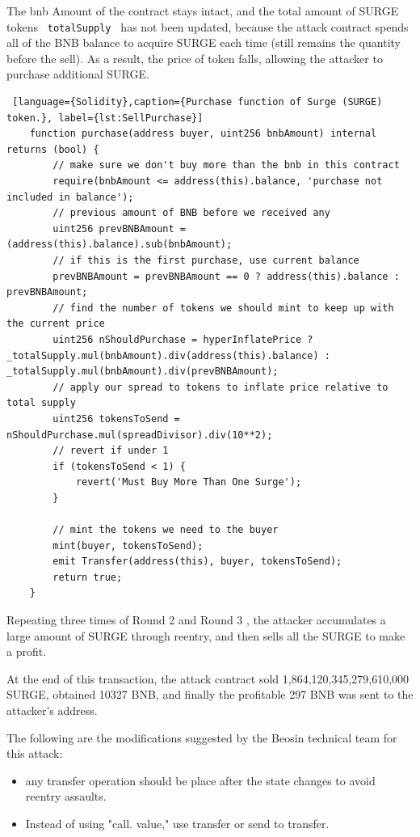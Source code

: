 The bnb Amount of the contract stays intact, and the total amount of SURGE tokens \texttt{ totalSupply }  
has not been updated, because the attack contract spends all of the BNB balance to acquire SURGE
 each time (still remains the quantity before the sell).
As a result, the price of token falls, allowing the attacker to purchase additional SURGE. 


\begin{lstlisting} [language={Solidity},caption={Purchase function of Surge (SURGE) token.}, label={lst:SellPurchase}]
    function purchase(address buyer, uint256 bnbAmount) internal returns (bool) {
        // make sure we don't buy more than the bnb in this contract
        require(bnbAmount <= address(this).balance, 'purchase not included in balance');
        // previous amount of BNB before we received any        
        uint256 prevBNBAmount = (address(this).balance).sub(bnbAmount);
        // if this is the first purchase, use current balance
        prevBNBAmount = prevBNBAmount == 0 ? address(this).balance : prevBNBAmount;
        // find the number of tokens we should mint to keep up with the current price
        uint256 nShouldPurchase = hyperInflatePrice ? _totalSupply.mul(bnbAmount).div(address(this).balance) : _totalSupply.mul(bnbAmount).div(prevBNBAmount);
        // apply our spread to tokens to inflate price relative to total supply
        uint256 tokensToSend = nShouldPurchase.mul(spreadDivisor).div(10**2);
        // revert if under 1
        if (tokensToSend < 1) {
            revert('Must Buy More Than One Surge');
        }
        
        // mint the tokens we need to the buyer
        mint(buyer, tokensToSend);
        emit Transfer(address(this), buyer, tokensToSend);
        return true;
    }
\end{lstlisting}

Repeating three times of Round 2 and Round 3 , the attacker accumulates a large amount of SURGE through reentry, and then sells all the SURGE to make a profit.

At the end of this transaction, the attack contract sold 1,864,120,345,279,610,000 SURGE, 
obtained 10327 BNB, and finally the profitable 297 BNB was sent to the attacker's address.

The following are the modifications suggested by the Beosin technical team for this attack:
\begin{itemize}
    \item any transfer operation should be place after the state changes to avoid reentry assaults.
    \item Instead of using "call. value," use transfer or send to transfer. 
\end{itemize}
